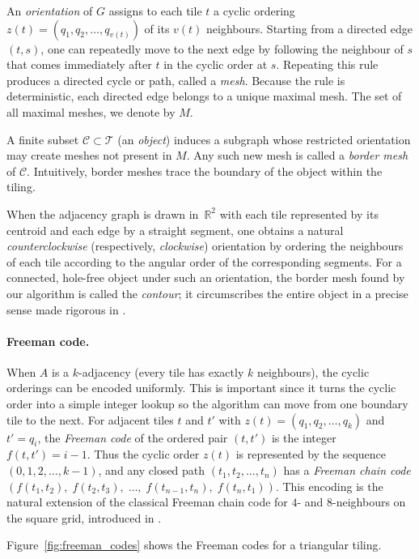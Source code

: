 An \emph{orientation} of $G$ assigns to each tile $t$ a cyclic ordering $z(t) = (q_1, q_2, \dots, q_{v(t)})$ of its $v(t)$ neighbours.
Starting from a directed edge $(t,s)$, one can repeatedly move to the next edge by following the neighbour of $s$ that comes immediately after $t$ in the cyclic order at $s$.
Repeating this rule produces a directed cycle or path, called a \emph{mesh}.
Because the rule is deterministic, each directed edge belongs to a unique maximal mesh.
The set of all maximal meshes, we denote by $M$.

A finite subset $\mathcal{C} \subset \mathcal{T}$ (an \emph{object}) induces a subgraph whose restricted orientation may create meshes not present in $M$.
Any such new mesh is called a \emph{border mesh} of $\mathcal{C}$.
Intuitively, border meshes trace the boundary of the object within the tiling.

When the adjacency graph is drawn in~$\mathbb{R}^2$ with each tile represented by its centroid and each edge by a straight segment, one obtains a natural \emph{counterclockwise} (respectively, \emph{clockwise}) orientation by ordering the neighbours of each tile according to the angular order of the corresponding segments.
For a connected, hole-free object under such an orientation, the border mesh found by our algorithm is called the \emph{contour}; it circumscribes the entire object in a precise sense made rigorous in \cite[Theorem~1]{WiederholdMatosWiederhold2026}.

\paragraph{Freeman code.}
When $A$ is a $k$-adjacency (every tile has exactly $k$ neighbours), the cyclic orderings can be encoded uniformly.
This is important since it turns the cyclic order into a simple integer lookup so the algorithm can move from one boundary tile to the next.
For adjacent tiles $t$ and $t'$ with $z(t) = (q_1, q_2, \dots, q_k)$ and $t' = q_i$, the \emph{Freeman code} of the ordered pair $(t,t')$ is the integer $f(t,t') = i - 1$.
Thus the cyclic order $z(t)$ is represented by the sequence $(0, 1, 2, \dots, k-1)$, and any closed path
$(t_1, t_2, \dots, t_n)$ has a \emph{Freeman chain code} $(f(t_1,t_2),\; f(t_2,t_3),\; \dots,\; f(t_{n-1},t_n),\; f(t_n,t_1))$.
This encoding is the natural extension of the classical Freeman chain code for $4$- and $8$-neighbours on the square grid, introduced in \cite{gonzalez2018}.

Figure~\ref{fig:freeman_codes} shows the Freeman codes for a triangular tiling.

